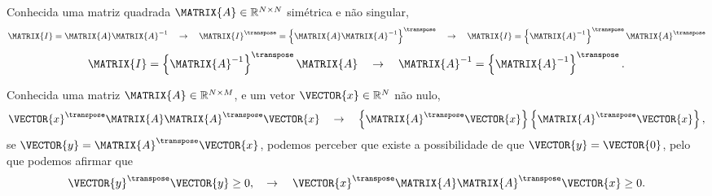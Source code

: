 \begin{myproofT}\label{proof:theo:simetricmatrix4}
Conhecida uma matriz quadrada $\MATRIX{A} \in \mathbb{R}^{N \times N}$ simétrica e não singular, 
\begin{equation}
\MATRIX{I}=\MATRIX{A}\MATRIX{A}^{-1}
\quad \rightarrow \quad
\MATRIX{I}^{\transpose}=\left\{\MATRIX{A}\MATRIX{A}^{-1}\right\}^{\transpose}
\quad \rightarrow \quad
\MATRIX{I}=\left\{\MATRIX{A}^{-1}\right\}^{\transpose} \MATRIX{A}^{\transpose}
\end{equation}
\begin{equation}
\MATRIX{I}=\left\{\MATRIX{A}^{-1}\right\}^{\transpose} \MATRIX{A}
\quad \rightarrow \quad
\MATRIX{A}^{-1}=\left\{\MATRIX{A}^{-1}\right\}^{\transpose}.
\end{equation}
\end{myproofT}


\begin{myproofT}\label{proof:theo:semipositivematrix1}
Conhecida uma matriz $\MATRIX{A} \in \mathbb{R}^{N \times M}$,
e um vetor $\VECTOR{x} \in \mathbb{R}^{N}$ não nulo,
\begin{equation}
\VECTOR{x}^{\transpose}\MATRIX{A}\MATRIX{A}^{\transpose}\VECTOR{x}
\quad \rightarrow \quad
\left\{\MATRIX{A}^{\transpose}\VECTOR{x}\right\}\left\{\MATRIX{A}^{\transpose}\VECTOR{x}\right\},
\end{equation}
se $\VECTOR{y}=\MATRIX{A}^{\transpose}\VECTOR{x}$, 
podemos perceber que existe a possibilidade de que $\VECTOR{y}=\VECTOR{0}$,
pelo que podemos afirmar que 
\begin{equation}
\VECTOR{y}^{\transpose}\VECTOR{y}\geq 0,
\quad \rightarrow \quad
\VECTOR{x}^{\transpose}\MATRIX{A}\MATRIX{A}^{\transpose}\VECTOR{x}\geq 0.
\end{equation}
\end{myproofT}

